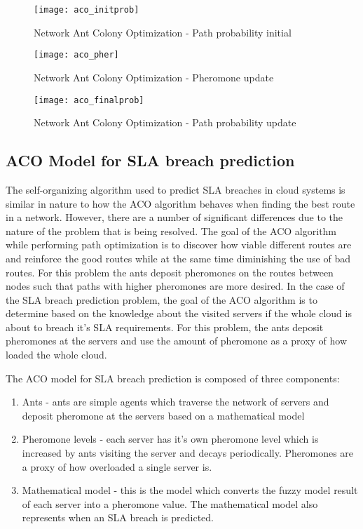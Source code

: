\begin{figure}
	\centering
	\texttt{[image: aco\_initprob]}
	\caption{Network Ant Colony Optimization - Path probability initial}
	\label{fig:aco_initprob}
\end{figure}

\begin{figure}
	\centering
	\texttt{[image: aco\_pher]}
	\caption{Network Ant Colony Optimization - Pheromone update}
	\label{fig:aco_pher}
\end{figure}

\begin{figure}
	\centering
	\texttt{[image: aco\_finalprob]}
	\caption{Network Ant Colony Optimization - Path probability update}
	\label{fig:aco_finalprob}
\end{figure}

\subsection{ACO Model for SLA breach prediction}

The self-organizing algorithm used to predict SLA breaches in cloud systems is similar in nature to how the ACO algorithm behaves when finding the best route in a network. However, there are a number of significant differences due to the nature of the problem that is being resolved. The goal of the ACO algorithm while performing path optimization is to discover how viable different routes are and reinforce the good routes while at the same time diminishing the use of bad routes. For this problem the ants deposit pheromones on the routes between nodes such that paths with higher pheromones are more desired. In the case of the SLA breach prediction problem, the goal of the ACO algorithm is to determine based on the knowledge about the visited servers if the whole cloud is about to breach it's SLA requirements. For this problem, the ants deposit pheromones at the servers and use the amount of pheromone as a proxy of how loaded the whole cloud.

The ACO model for SLA breach prediction is composed of three components:

\begin{enumerate}
	\item Ants - ants are simple agents which traverse the network of servers and deposit pheromone at the servers based on a mathematical model
	\item Pheromone levels - each server has it's own pheromone level which is increased by ants visiting the server and decays periodically. Pheromones are a proxy of how overloaded a single server is.
	\item Mathematical model - this is the model which converts the fuzzy model result of each server into a pheromone value. The mathematical model also represents when an SLA breach is predicted.
\end{enumerate}

